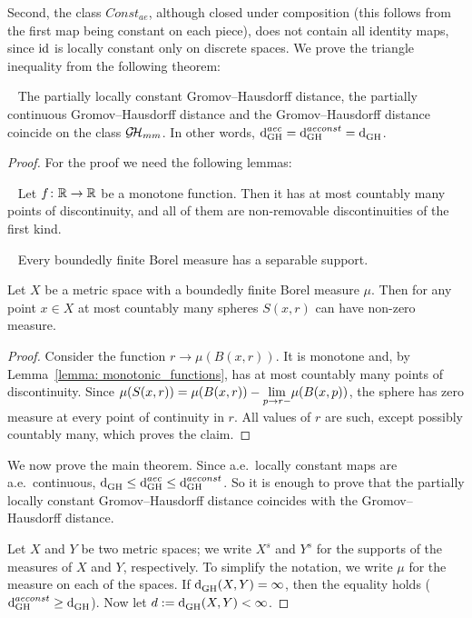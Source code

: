    Second, the class $Const_{ae}$, although closed under composition (this follows from the first map being constant on each piece), does not contain all identity maps, since $\operatorname{id}$ is locally constant only on discrete spaces. We prove the triangle inequality from the following theorem:
  \begin{theorem}~\label{theorem: aec equal original}
    The partially locally constant Gromov--Hausdorff distance, the partially continuous Gromov--Hausdorff distance and the Gromov--Hausdorff distance coincide on the class $\operatorname{\mathcal{G\!H}}_{mm}$. 
    In other words, $\operatorname{d}^{aec}_{\mathrm{GH}} = \operatorname{d}^{aeconst}_{\mathrm{GH}} = \operatorname{d}^{}_{\mathrm{GH}}$.
  \end{theorem}
  \begin{proof}
    For the proof we need the following lemmas:

    \begin{lemma}~\label{lemma: monotonic_functions}
      Let $f\colon \mathbb R \to \mathbb R$ be a monotone function.
Then it has at most countably many points of discontinuity, and all of them are non-removable discontinuities of the first kind.
    \end{lemma}

    \begin{theorem}~\label{lemma: separable support}
      Every boundedly finite Borel measure has a separable support.
    \end{theorem}

    \begin{lemma}\label{lemma: ae spheres}
      Let $X$ be a metric space with a boundedly finite Borel measure $\mu$.
Then for any point $x \in X$ at most countably many spheres $S(x,r)$ can have non-zero measure.
    \end{lemma}
    \begin{proof}

    Consider the function $r \to  \mu(B(x,r))$.
    It is monotone and, by Lemma~\ref{lemma: monotonic_functions}, has at most countably many points of discontinuity.
    Since $\mu(S(x,r)) = \mu(B(x,r)) - \underset{p \to r-}{\lim} \mu(B(x,p))$, the sphere has zero measure at every point of continuity in $r$.
    All values of $r$ are such, except possibly countably many, which proves the claim.
    \end{proof}
    We now prove the main theorem.
    Since a.e.\ locally constant maps are a.e.\ continuous, $\operatorname{d}^{}_{\mathrm{GH}} \leq \operatorname{d}^{aec}_{\mathrm{GH}} \leq \operatorname{d}^{aeconst}_{\mathrm{GH}}$.
    So it is enough to prove that the partially locally constant Gromov--Hausdorff distance coincides with the Gromov--Hausdorff distance. \par
    Let $X$ and $Y$ be two metric spaces; we write $X^s$ and $Y^s$ for the supports of the measures of $X$ and $Y$, respectively.
    To simplify the notation, we write $\mu$ for the measure on each of the spaces.
    If $\operatorname{d}^{}_{\mathrm{GH}}(X,Y) = \infty$, then the equality holds ($\operatorname{d}^{aeconst}_{\mathrm{GH}} \geq \operatorname{d}^{}_{\mathrm{GH}}$).
    Now let $d := \operatorname{d}^{}_{\mathrm{GH}}(X,Y) < \infty$.\par
    

\end{proof}
